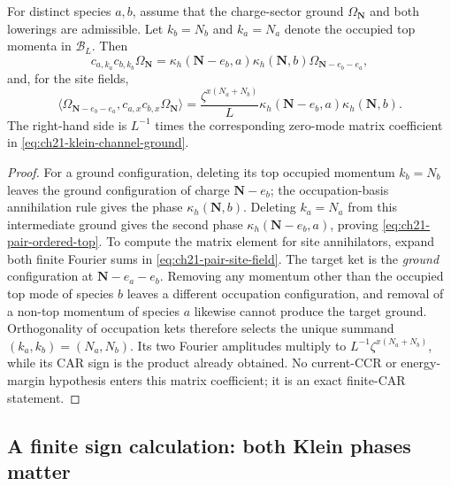 \begin{lemma}
\label{lem:ch21-pair-ground-action}
For distinct species \(a,b\), assume that the charge-sector ground
\(\Omega_{\mathbf N}\) and both lowerings are admissible.  Let
\(k_b=N_b\) and \(k_a=N_a\) denote the occupied top momenta in
\(\mathcal B_L\).  Then
\begin{equation}
 c_{a,k_a}c_{b,k_b}\Omega_{\mathbf N}
  =\kappa_h(\mathbf N-e_b,a)\kappa_h(\mathbf N,b)
      \Omega_{\mathbf N-e_b-e_a},
 \label{eq:ch21-pair-ordered-top}
\end{equation}
and, for the site fields,
\begin{equation}
 \big\langle\Omega_{\mathbf N-e_b-e_a},
  c_{a,x}c_{b,x}\Omega_{\mathbf N}\big\rangle
   =\frac{\zeta^{x(N_a+N_b)}}{L}
     \kappa_h(\mathbf N-e_b,a)\kappa_h(\mathbf N,b).
 \label{eq:ch21-pair-channel-coefficient}
\end{equation}
The right-hand side is \(L^{-1}\) times the corresponding
zero-mode matrix coefficient in \eqref{eq:ch21-klein-channel-ground}.
\end{lemma}

\begin{proof}
For a ground configuration, deleting its top occupied momentum
\(k_b=N_b\) leaves the ground configuration of charge
\(\mathbf N-e_b\); the occupation-basis annihilation rule gives the
phase \(\kappa_h(\mathbf N,b)\).  Deleting \(k_a=N_a\) from this
intermediate ground gives the second phase
\(\kappa_h(\mathbf N-e_b,a)\), proving
\eqref{eq:ch21-pair-ordered-top}.
To compute the matrix element for site annihilators, expand both
finite Fourier sums in \eqref{eq:ch21-pair-site-field}.
The target ket is the \emph{ground} configuration at
\(\mathbf N-e_a-e_b\).  Removing any momentum other than the
occupied top mode of species \(b\) leaves a different occupation
configuration, and removal of a non-top momentum of species \(a\)
likewise cannot produce the target ground.  Orthogonality of
occupation kets therefore selects the unique summand
\((k_a,k_b)=(N_a,N_b)\).  Its two Fourier amplitudes multiply to
\(L^{-1}\zeta^{x(N_a+N_b)}\), while its CAR sign is the product
already obtained.  No current-CCR or energy-margin hypothesis enters
this matrix coefficient; it is an exact finite-CAR statement.
\end{proof}

\subsection*{A finite sign calculation: both Klein phases matter}

